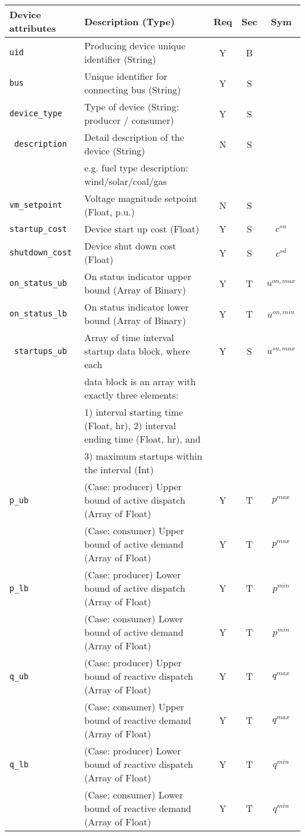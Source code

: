\documentclass{article}
\begin{document}
\begin{center}
\small
\begin{tabular}{ l | l | c | c | c |}
Device attributes & Description (Type) & Req & Sec & Sym\\
\hline
  {\tt uid} & Producing device unique identifier (String) & Y & B &  \\
  {\tt bus} & Unique identifier for connecting bus (String)& Y & S & \\
  {\tt device\_type} & Type of device (String: producer / consumer) & Y & S & \\
  {\tt\color{red} description} & Detail description of the device  (String) & N & S & \\
      &e.g. fuel type description: wind/solar/coal/gas  &  &  & \\
  {\tt vm\_setpoint} & Voltage magnitude setpoint (Float, p.u.) & N & S & \\
  {\tt startup\_cost} & Device start up cost (Float) & Y & S & $c^{su}$\\
  {\tt shutdown\_cost} & Device shut down cost (Float) & Y & S & $c^{sd}$\\
  {\tt on\_status\_ub} & On status indicator upper bound (Array of Binary) & Y & T & $u^{on,max}$\\
  {\tt on\_status\_lb} & On status indicator lower bound (Array of Binary) & Y & T & $u^{on,min}$\\
  {\tt\color{red} startups\_ub} & {\color{red} Array of time interval startup data block, where each} & Y & S & $u^{su,max}$\\
                                & {\color{red} data block is an array with exactly three elements:} &   &   & \\
                                & {\color{red} 1) interval starting time (Float, hr), 2) interval ending time (Float, hr), and } &   &   & \\
                                & {\color{red} 3) maximum startups within the interval (Int) } &   &   & \\
  {\tt p\_ub} & { (Case: producer) Upper bound of active dispatch (Array of Float)   }& Y & T & $p^{max}$ \\
              & { (Case: consumer) Upper bound of active demand   (Array of Float)    }& Y & T & $p^{max}$ \\
  {\tt p\_lb} & { (Case: producer) Lower bound of active dispatch (Array of Float)    }& Y & T & $p^{min}$ \\
              & { (Case: consumer) Lower bound of active demand   (Array of Float)    }& Y & T & $p^{min}$ \\
  {\tt q\_ub} & { (Case: producer) Upper bound of reactive dispatch (Array of Float)  }& Y & T & $q^{max}$\\
              & { (Case: consumer) Upper bound of reactive demand   (Array of Float)  }& Y & T & $q^{max}$\\
  {\tt q\_lb} & { (Case: producer) Lower bound of reactive dispatch (Array of Float)  }& Y & T & $q^{min}$\\
              & { (Case: consumer) Lower bound of reactive demand   (Array of Float)  }& Y & T & $q^{min}$\\


\end{tabular}
\end{center}
\end{document}
